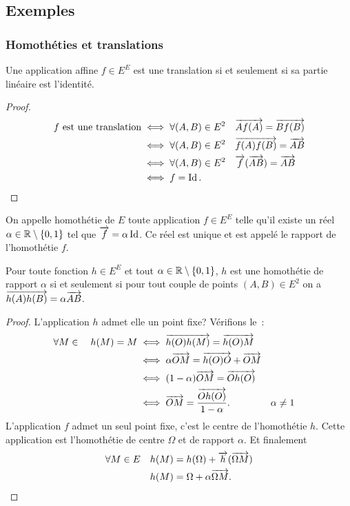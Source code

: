 \subsection{Exemples}

\subsubsection{Homothéties et translations}

\begin{prop}
  Une application affine \(f \in E^E\) est une translation si et seulement si sa 
  partie linéaire est l'identité.
\end{prop}
\begin{proof}
  \begin{align*}
    f \text{~est une translation} &\iff \forall (A,B) \in E^2 \quad \overrightarrow{Af(A)} 
    = \overrightarrow{Bf(B)} \\
    &\iff \forall (A,B) \in E^2 \quad \overrightarrow{f(A)f(B)} = \overrightarrow{AB} \\
    &\iff \forall (A,B) \in E^2 \quad \overrightarrow{f}(\overrightarrow{AB}) = \overrightarrow{AB} \\
    &\iff f=\operatorname{Id}.
  \end{align*}
\end{proof}

\begin{defdef}
  On appelle homothétie de \(E\) toute application \(f \in E^E\) telle qu'il 
  existe un réel \(\alpha \in \mathbb{R}\setminus\{0, 1\}\) tel que \(\overrightarrow{f}=\alpha 
  \operatorname{Id}\). Ce réel est unique et est appelé le rapport de l'homothétie \(f\).
\end{defdef}
\begin{prop}
  Pour toute fonction \(h \in E^E\) et tout \(\alpha \in \mathbb{R}\setminus\{0, 1\}\), 
  \(h\) est une homothétie de rapport \(\alpha\) si et seulement si pour tout 
  couple de points \((A, B) \in E^2\) on a \(\overrightarrow{h(A)h(B)}=\alpha \overrightarrow{AB}\).
\end{prop}
\begin{proof}
  L'application \(h\) admet elle un point fixe? Vérifions le~:
  \begin{align*}
    \forall M \in \quad h(M) = M &\iff \overrightarrow{h(O)h(M)} = \overrightarrow{h(O)M} \\
    &\iff \alpha \overrightarrow{OM} =\overrightarrow{h(O)O} +\overrightarrow{OM} \\
    &\iff (1-\alpha) \overrightarrow{OM} = \overrightarrow{Oh(O)} \\
    &\iff \overrightarrow{OM} = \frac{\overrightarrow{Oh(O)}}{1-\alpha}. && \alpha \neq 1
  \end{align*}
  L'application \(f\) admet un seul point fixe, c'est le centre de l'homothétie 
  \(h\). Cette application est l'homothétie de centre \(\Omega\) et de rapport 
  \(\alpha\). Et finalement
  \begin{align*}
    \forall M \in E \quad h(M) &= h(\Omega)+\overrightarrow{h}(\overrightarrow{\Omega M}) \\
    h(M) &=  \Omega +\alpha \overrightarrow{\Omega M}.
  \end{align*}
\end{proof}

